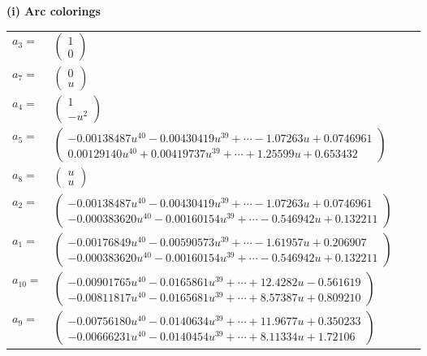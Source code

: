 \documentclass[1p]{elsarticle_modified}
\theoremstyle{definition}
\begin{document}
\flushleft \textbf{(i) Arc colorings}\\
\begin{tabular}{m{7pt} m{180pt} m{7pt} m{180pt} }
\flushright $a_{3}=$&$\begin{pmatrix}1\\0\end{pmatrix}$ \\
\flushright $a_{7}=$&$\begin{pmatrix}0\\u\end{pmatrix}$ \\
\flushright $a_{4}=$&$\begin{pmatrix}1\\- u^2\end{pmatrix}$ \\
\flushright $a_{5}=$&$\begin{pmatrix}-0.00138487 u^{40}-0.00430419 u^{39}+\cdots-1.07263 u+0.0746961\\0.00129140 u^{40}+0.00419737 u^{39}+\cdots+1.25599 u+0.653432\end{pmatrix}$ \\
\flushright $a_{8}=$&$\begin{pmatrix}u\\u\end{pmatrix}$ \\
\flushright $a_{2}=$&$\begin{pmatrix}-0.00138487 u^{40}-0.00430419 u^{39}+\cdots-1.07263 u+0.0746961\\-0.000383620 u^{40}-0.00160154 u^{39}+\cdots-0.546942 u+0.132211\end{pmatrix}$ \\
\flushright $a_{1}=$&$\begin{pmatrix}-0.00176849 u^{40}-0.00590573 u^{39}+\cdots-1.61957 u+0.206907\\-0.000383620 u^{40}-0.00160154 u^{39}+\cdots-0.546942 u+0.132211\end{pmatrix}$ \\
\flushright $a_{10}=$&$\begin{pmatrix}-0.00901765 u^{40}-0.0165861 u^{39}+\cdots+12.4282 u-0.561619\\-0.00811817 u^{40}-0.0165681 u^{39}+\cdots+8.57387 u+0.809210\end{pmatrix}$ \\
\flushright $a_{9}=$&$\begin{pmatrix}-0.00756180 u^{40}-0.0140634 u^{39}+\cdots+11.9677 u+0.350233\\-0.00666231 u^{40}-0.0140454 u^{39}+\cdots+8.11334 u+1.72106\end{pmatrix}$ \\

\end{tabular}
\end{document}
